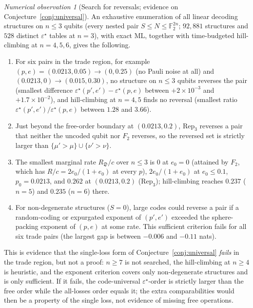 \documentclass[11pt,a4paper]{article}
\theoremstyle{plain}
\theoremstyle{definition}
\theoremstyle{remark}
\newtheorem{observation}[theorem]{Numerical observation}
\newcommand{\F}{\mathbb{F}_2}
\newcommand{\err}{\varepsilon^{\star}}
\newcommand{\Rep}{\mathrm{Rep}}
\begin{document}
\begin{observation}[Search for reversals; evidence on Conjecture~\ref{conj:universal}]\label{obs:search}
An exhaustive enumeration of all linear decoding structures on $n\le3$ qubits (every nested pair $S\le N\le\F^{2n}$; $92{,}881$ structures and $528$ distinct $\err$ tables at $n=3$), with exact ML, together with time-budgeted hill-climbing at $n=4,5,6$, gives the following.
\begin{enumerate}[label=(\alph*)]
\item For six pairs in the trade region, for example $(p,e)=(0.0213,0.05)\to(0,0.25)$ (no Pauli noise at all) and $(0.0213,0)\to(0.015,0.30)$, no structure on $n\le3$ qubits reverses the pair (smallest difference $\err(p',e')-\err(p,e)$ between $+2\times10^{-3}$ and $+1.7\times10^{-2}$), and hill-climbing at $n=4,5$ finds no reversal (smallest ratio $\err(p',e')/\err(p,e)$ between $1.28$ and $3.66$).
\item Just beyond the free-order boundary at $(0.0213,0.2)$, $\Rep_3$ reverses a pair that neither the uncoded qubit nor $F_2$ reverses, so the reversed set is strictly larger than $\{\mu'>\mu\}\cup\{\nu'>\nu\}$.
\item The smallest marginal rate $R_{\mathfrak D}/c$ over $n\le3$ is $0$ at $e_0=0$ (attained by $F_2$, which has $R/c=2e_0/(1+e_0)$ at every $p$), $2e_0/(1+e_0)$ at $e_0\le0.1$, $p_0=0.0213$, and $0.262$ at $(0.0213,0.2)$ ($\Rep_3$); hill-climbing reaches $0.237$ ($n=5$) and $0.235$ ($n=6$) there.
\item For non-degenerate structures ($S=0$), large codes could reverse a pair if a random-coding or expurgated exponent of $(p',e')$ exceeded the sphere-packing exponent of $(p,e)$ at some rate. This sufficient criterion fails for all six trade pairs (the largest gap is between $-0.006$ and $-0.11$ nats).
\end{enumerate}
\end{observation}

\noindent This is evidence that the single-loss form of Conjecture~\ref{conj:universal} \emph{fails} in the trade region, but not a proof: $n\ge7$ is not searched, the hill-climbing at $n\ge4$ is heuristic, and the exponent criterion covers only non-degenerate structures and is only sufficient. If it fails, the code-universal $\err$-order is strictly larger than the free order while the all-losses order equals it; the extra comparabilities would then be a property of the single loss, not evidence of missing free operations.
\end{document}
